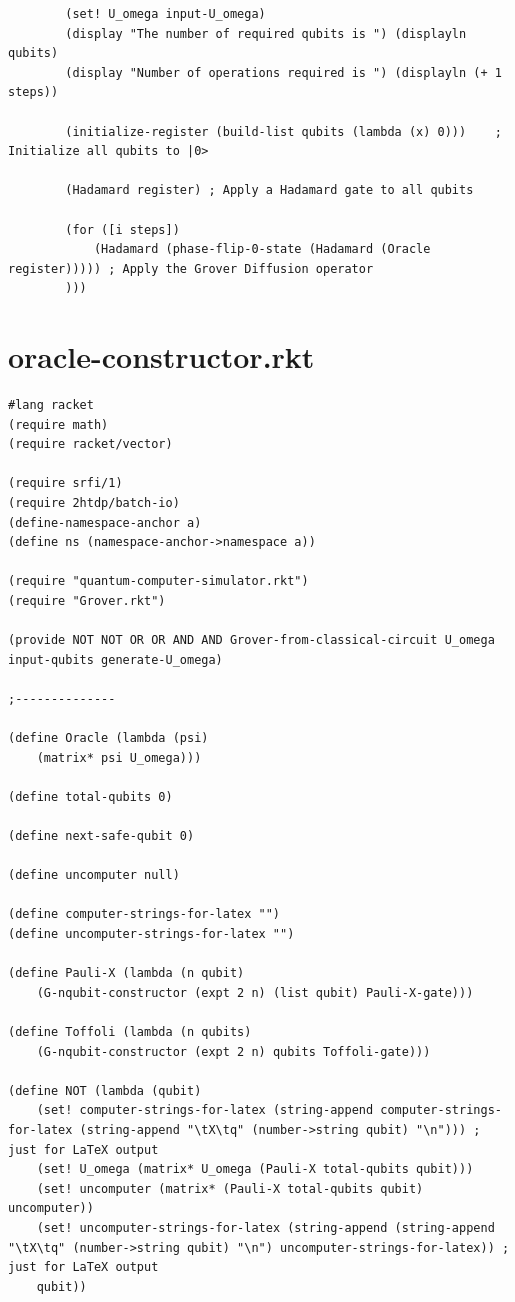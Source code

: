 \documentclass[11pt]{report}
\newcommand{\?}{\stackrel{?}{=}}
\begin{document}
\begin{appendix}
\begin{lstlisting}
		(set! U_omega input-U_omega)
		(display "The number of required qubits is ") (displayln qubits)
		(display "Number of operations required is ") (displayln (+ 1 steps))

		(initialize-register (build-list qubits (lambda (x) 0)))	; Initialize all qubits to |0>

		(Hadamard register)	; Apply a Hadamard gate to all qubits

		(for ([i steps])
			(Hadamard (phase-flip-0-state (Hadamard (Oracle register))))) ; Apply the Grover Diffusion operator
		)))
	\end{lstlisting}
	\chapter{oracle-constructor.rkt}
	\begin{lstlisting}
#lang racket
(require math)
(require racket/vector)

(require srfi/1)
(require 2htdp/batch-io)
(define-namespace-anchor a)
(define ns (namespace-anchor->namespace a))

(require "quantum-computer-simulator.rkt")
(require "Grover.rkt")

(provide NOT NOT OR OR AND AND Grover-from-classical-circuit U_omega input-qubits generate-U_omega)

;--------------

(define Oracle (lambda (psi)
	(matrix* psi U_omega)))

(define total-qubits 0)

(define next-safe-qubit 0)

(define uncomputer null)

(define computer-strings-for-latex "")
(define uncomputer-strings-for-latex "")

(define Pauli-X (lambda (n qubit)
	(G-nqubit-constructor (expt 2 n) (list qubit) Pauli-X-gate)))

(define Toffoli (lambda (n qubits)
	(G-nqubit-constructor (expt 2 n) qubits Toffoli-gate)))

(define NOT (lambda (qubit)
	(set! computer-strings-for-latex (string-append computer-strings-for-latex (string-append "\tX\tq" (number->string qubit) "\n"))) ; just for LaTeX output
	(set! U_omega (matrix* U_omega (Pauli-X total-qubits qubit)))
	(set! uncomputer (matrix* (Pauli-X total-qubits qubit) uncomputer))
	(set! uncomputer-strings-for-latex (string-append (string-append "\tX\tq" (number->string qubit) "\n") uncomputer-strings-for-latex)) ; just for LaTeX output
	qubit))


\end{lstlisting}
\end{appendix}
\end{document}
